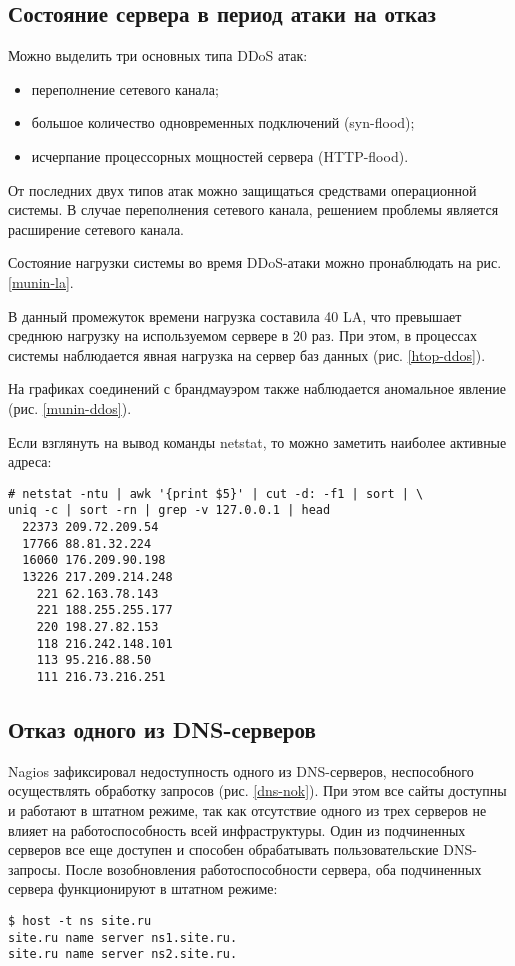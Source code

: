 \subsection{Состояние сервера в период атаки на отказ}

Можно выделить три основных типа DDoS атак:
\begin{itemize}
  \item переполнение сетевого канала;
  \item большое количество одновременных подключений (syn-flood);
  \item исчерпание процессорных мощностей сервера (HTTP-flood).
\end{itemize}

От последних двух типов атак можно защищаться средствами операционной системы.
В случае переполнения сетевого канала, решением проблемы является расширение сетевого канала.

Состояние нагрузки системы во время DDoS-атаки можно пронаблюдать на рис. \ref{munin-la}.

В данный промежуток времени нагрузка составила 40 LA, что превышает среднюю нагрузку на используемом сервере в 20 раз.
При этом, в процессах системы наблюдается явная нагрузка на сервер баз данных (рис. \ref{htop-ddos}).

На графиках соединений с брандмауэром также наблюдается аномальное явление (рис. \ref{munin-ddos}).

Если взглянуть на вывод команды netstat, то можно заметить наиболее активные адреса:
\begin{lstlisting}
# netstat -ntu | awk '{print $5}' | cut -d: -f1 | sort | \
uniq -c | sort -rn | grep -v 127.0.0.1 | head
  22373 209.72.209.54
  17766 88.81.32.224
  16060 176.209.90.198
  13226 217.209.214.248
    221 62.163.78.143
    221 188.255.255.177
    220 198.27.82.153
    118 216.242.148.101
    113 95.216.88.50
    111 216.73.216.251
\end{lstlisting}
\subsection{Отказ одного из DNS-серверов}
Nagios зафиксировал недоступность одного из DNS-серверов, неспособного осуществлять обработку запросов (рис. \ref{dns-nok}).
\addimghere{dns-nok}{1}{Недоступность DNS-сервера}{dns-nok}
При этом все сайты доступны и работают в штатном режиме, так как отсутствие одного из трех серверов не влияет на работоспособность всей инфраструктуры.
Один из подчиненных серверов все еще доступен и способен обрабатывать пользовательские DNS-запросы.
После возобновления работоспособности сервера, оба подчиненных сервера функционируют в штатном режиме:
\begin{lstlisting}
$ host -t ns site.ru
site.ru name server ns1.site.ru.
site.ru name server ns2.site.ru.
\end{lstlisting}

